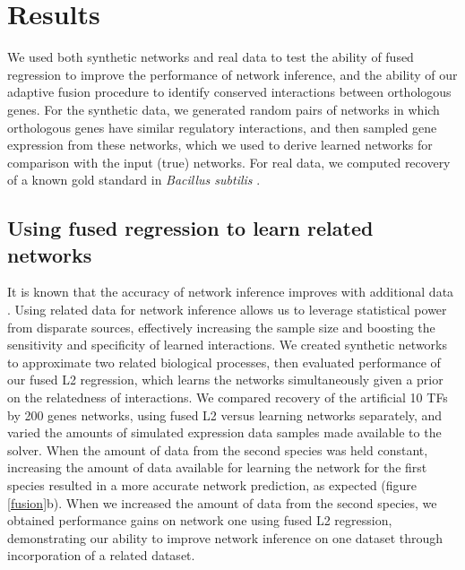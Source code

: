 \documentclass[11pt]{article}
\begin{document}
\section{Results}
We used both synthetic networks and real data to test the ability of fused regression to improve the performance of network inference, and the ability of our adaptive fusion procedure to identify conserved interactions between orthologous genes. 
For the synthetic data, we generated random pairs of networks in which orthologous genes have similar regulatory interactions, and then sampled gene expression from these networks, which we used to derive learned networks for comparison with the input (true) networks. 
For real data, we computed recovery of a known gold standard in \textit{Bacillus subtilis} \cite{michna_subtiwikidatabase_2014}. 

\subsection{Using fused regression to learn related networks}
It is known that the accuracy of network inference improves with additional data \cite{bar-joseph_computational_2003}. 
Using related data for network inference allows us to leverage statistical power from disparate sources, effectively increasing the sample size and boosting the sensitivity and specificity of learned interactions. 
We created synthetic networks to approximate two related biological processes, then evaluated performance of our fused L2 regression, which learns the networks simultaneously given a prior on the relatedness of interactions. 
We compared recovery of the artificial 10 TFs by 200 genes networks, using fused L2 versus learning networks separately, and varied the amounts of simulated expression data samples made available to the solver. 
When the amount of data from the second species was held constant, increasing the amount of data available for learning the network for the first species resulted in a more accurate network prediction, as expected  (figure \ref{fusion}b). 
When we increased the amount of data from the second species, we obtained performance gains on network one using fused L2 regression, demonstrating our ability to improve network inference on one dataset through incorporation of a related dataset.
\end{document}

